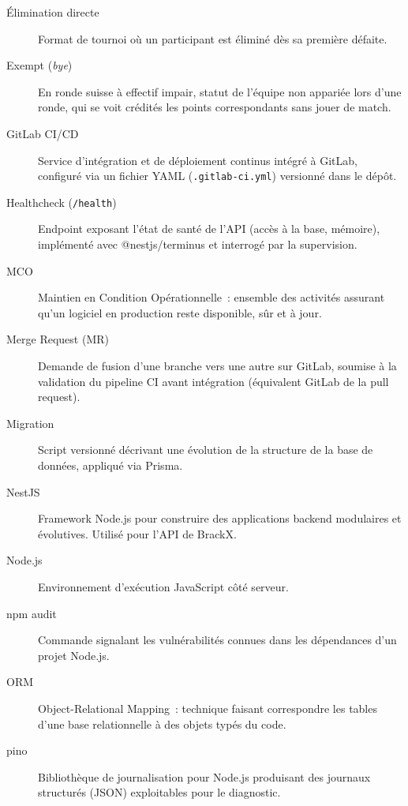 \begin{description}
    \item[Élimination directe] Format de tournoi où un participant est éliminé dès sa première défaite.

    \item[Exempt (\emph{bye})] En ronde suisse à effectif impair, statut de l'équipe non appariée lors d'une ronde, qui se voit crédités les points correspondants sans jouer de match.

    \item[GitLab CI/CD] Service d'intégration et de déploiement continus intégré à GitLab, configuré via un fichier YAML (\texttt{.gitlab-ci.yml}) versionné dans le dépôt.

    \item[Healthcheck (\texttt{/health})] Endpoint exposant l'état de santé de l'API (accès à la base, mémoire), implémenté avec @nestjs/terminus et interrogé par la supervision.

    \item[MCO] Maintien en Condition Opérationnelle~: ensemble des activités assurant qu'un logiciel en production reste disponible, sûr et à jour.

    \item[Merge Request (MR)] Demande de fusion d'une branche vers une autre sur GitLab, soumise à la validation du pipeline CI avant intégration (équivalent GitLab de la pull request).

    \item[Migration] Script versionné décrivant une évolution de la structure de la base de données, appliqué via Prisma.

    \item[NestJS] Framework Node.js pour construire des applications backend modulaires et évolutives. Utilisé pour l'API de BrackX.

    \item[Node.js] Environnement d'exécution JavaScript côté serveur.

    \item[npm audit] Commande signalant les vulnérabilités connues dans les dépendances d'un projet Node.js.

    \item[ORM] Object-Relational Mapping~: technique faisant correspondre les tables d'une base relationnelle à des objets typés du code.

    \item[pino] Bibliothèque de journalisation pour Node.js produisant des journaux structurés (JSON) exploitables pour le diagnostic.


\end{description}
